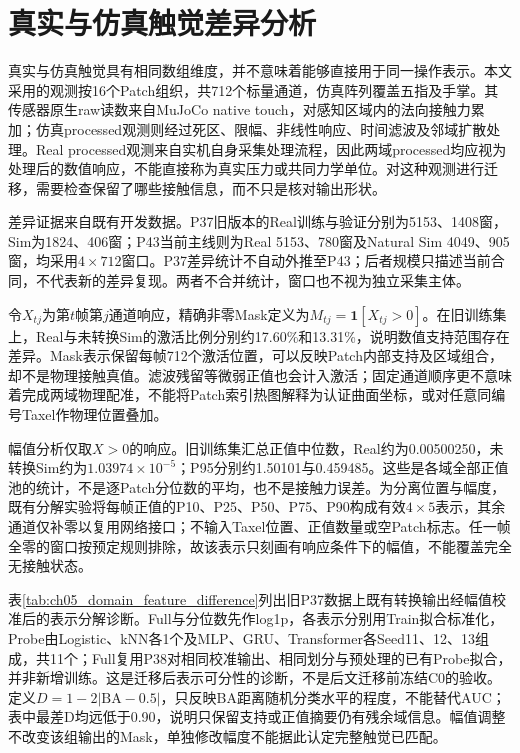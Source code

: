 \section{真实与仿真触觉差异分析}
\label{sec:ch05_real_sim_difference}

真实与仿真触觉具有相同数组维度，并不意味着能够直接用于同一操作表示。本文采用的观测按16个Patch组织，共712个标量通道，仿真阵列覆盖五指及手掌。其传感器原生raw读数来自MuJoCo native touch，对感知区域内的法向接触力累加；仿真processed观测则经过死区、限幅、非线性响应、时间滤波及邻域扩散处理。Real processed观测来自实机自身采集处理流程，因此两域processed均应视为处理后的数值响应，不能直接称为真实压力或共同力学单位。对这种观测进行迁移，需要检查保留了哪些接触信息，而不只是核对输出形状。

差异证据来自既有开发数据。P37旧版本的Real训练与验证分别为5153、1408窗，Sim为1824、406窗；P43当前主线则为Real 5153、780窗及Natural Sim 4049、905窗，均采用$4\times712$窗口。P37差异统计不自动外推至P43；后者规模只描述当前合同，不代表新的差异复现。两者不合并统计，窗口也不视为独立采集主体。

令$X_{tj}$为第$t$帧第$j$通道响应，精确非零Mask定义为$M_{tj}=\mathbf1[X_{tj}>0]$。在旧训练集上，Real与未转换Sim的激活比例分别约17.60\%和13.31\%，说明数值支持范围存在差异。Mask表示保留每帧712个激活位置，可以反映Patch内部支持及区域组合，却不是物理接触真值。滤波残留等微弱正值也会计入激活；固定通道顺序更不意味着完成两域物理配准，不能将Patch索引热图解释为认证曲面坐标，或对任意同编号Taxel作物理位置叠加。

幅值分析仅取$X>0$的响应。旧训练集汇总正值中位数，Real约为0.00500250，未转换Sim约为$1.03974\times10^{-5}$；P95分别约1.50101与0.459485。这些是各域全部正值池的统计，不是逐Patch分位数的平均，也不是接触力误差。为分离位置与幅度，既有分解实验将每帧正值的P10、P25、P50、P75、P90构成有效$4\times5$表示，其余通道仅补零以复用网络接口；不输入Taxel位置、正值数量或空Patch标志。任一帧全零的窗口按预定规则排除，故该表示只刻画有响应条件下的幅值，不能覆盖完全无接触状态。

表\ref{tab:ch05_domain_feature_difference}列出旧P37数据上既有转换输出经幅值校准后的表示分解诊断。Full与分位数先作log1p，各表示分别用Train拟合标准化，Probe由Logistic、kNN各1个及MLP、GRU、Transformer各Seed11、12、13组成，共11个；Full复用P38对相同校准输出、相同划分与预处理的已有Probe拟合，并非新增训练。这是迁移后表示可分性的诊断，不是后文迁移前冻结C0的验收。定义$D=1-2|\mathrm{BA}-0.5|$，只反映BA距离随机分类水平的程度，不能替代AUC；表中最差D均远低于0.90，说明只保留支持或正值摘要仍有残余域信息。幅值调整不改变该组输出的Mask，单独修改幅度不能据此认定完整触觉已匹配。


